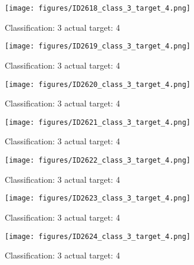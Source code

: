 \begin{figure}[h!]
\begin{center}
\texttt{[image: figures/ID2618\_class\_3\_target\_4.png]}
\end{center}
\caption{ Classification: 3 actual target: 4}
\label{fig:ID2618_class_3_target_4}
\end{figure}
\begin{figure}[h!]
\begin{center}
\texttt{[image: figures/ID2619\_class\_3\_target\_4.png]}
\end{center}
\caption{ Classification: 3 actual target: 4}
\label{fig:ID2619_class_3_target_4}
\end{figure}
\begin{figure}[h!]
\begin{center}
\texttt{[image: figures/ID2620\_class\_3\_target\_4.png]}
\end{center}
\caption{ Classification: 3 actual target: 4}
\label{fig:ID2620_class_3_target_4}
\end{figure}
\begin{figure}[h!]
\begin{center}
\texttt{[image: figures/ID2621\_class\_3\_target\_4.png]}
\end{center}
\caption{ Classification: 3 actual target: 4}
\label{fig:ID2621_class_3_target_4}
\end{figure}
\begin{figure}[h!]
\begin{center}
\texttt{[image: figures/ID2622\_class\_3\_target\_4.png]}
\end{center}
\caption{ Classification: 3 actual target: 4}
\label{fig:ID2622_class_3_target_4}
\end{figure}
\begin{figure}[h!]
\begin{center}
\texttt{[image: figures/ID2623\_class\_3\_target\_4.png]}
\end{center}
\caption{ Classification: 3 actual target: 4}
\label{fig:ID2623_class_3_target_4}
\end{figure}
\begin{figure}[h!]
\begin{center}
\texttt{[image: figures/ID2624\_class\_3\_target\_4.png]}
\end{center}
\caption{ Classification: 3 actual target: 4}
\label{fig:ID2624_class_3_target_4}
\end{figure}
